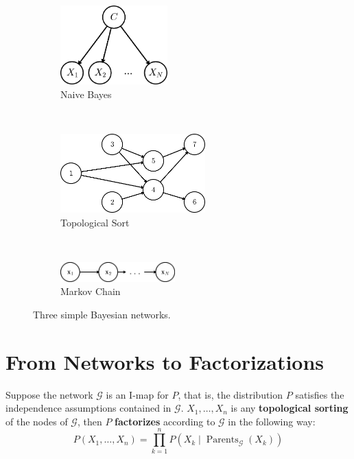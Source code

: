 \documentclass{discussion}
\DeclareMathOperator{\Parents}{Parents}
\newcommand{\G}{\mathcal{G}}
\begin{document}
\begin{figure}[h!tb]
    \centering
    \begin{subfigure}[t]{0.33\textwidth}
        \centering
        \includegraphics[height=1.2in]{images/naive-bayes}
        \caption{Naive Bayes \label{fig:naive-bayes}}
    \end{subfigure}%
    ~ 
    \begin{subfigure}[t]{0.33\textwidth}
        \centering
        \includegraphics[height=1.2in]{images/topological}
        \caption{Topological Sort}
    \end{subfigure}%
    ~ 
    \begin{subfigure}[t]{0.33\textwidth}
        \centering
        \includegraphics[height=0.3in]{images/markov-chain}
        \caption{Markov Chain \label{fig:markov-chain}}
    \end{subfigure}%
    \caption{\label{fig:pgms} Three simple Bayesian networks.}
\end{figure}

\pagebreak
\section{From Networks to Factorizations}

\begin{theorem}[Factorization]
Suppose the network $\G$ is an I-map for $P$, that is, the distribution $P$ satisfies the independence assumptions contained in $\G$.  $X_1, \dots, X_n$ is any \textbf{topological sorting} of the nodes of $\G$, then $P$ \textbf{factorizes} according to $\G$ in the following way:
    \begin{equation*}
    P(X_1,\dots,X_n)
    = \prod_{k=1}^n P(X_k \mid \Parents_\G(X_k))
    \end{equation*}
\end{theorem}
\end{document}
